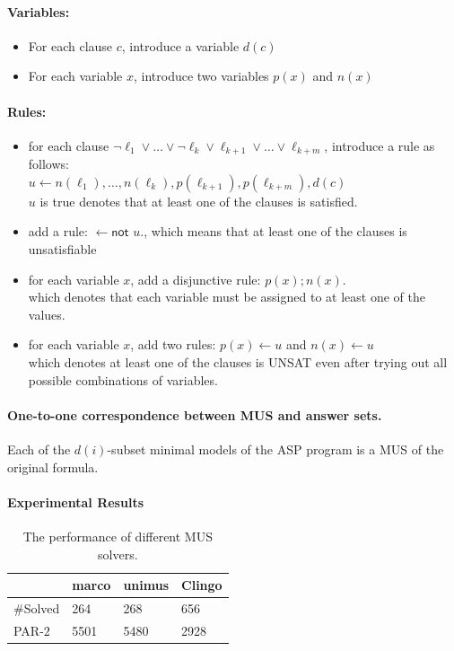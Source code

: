 \documentclass{article}
\begin{document}
\paragraph{Variables:}
\begin{itemize}
    \item For each clause $c$, introduce a variable $d(c)$
    \item For each variable $x$, introduce two variables $p(x)$ and $n(x)$
\end{itemize}
\paragraph{Rules:}
\begin{itemize}
    \item for each clause $\neg{\ell_1} \vee \ldots \vee 
    \neg{\ell_k} \vee \ell_{k+1} \vee \ldots \vee \ell_{k+m}$, 
    introduce a rule as follows:\\
    $u \leftarrow n(\ell_1), \ldots, n(\ell_k), p(\ell_{k+1}), p(\ell_{k+m}), d(c)$\\
    $u$ is true denotes that at least one of the clauses is satisfied.
    \item add a rule: $\leftarrow \textsf{not } u.$,
    which means that at least one of the clauses is unsatisfiable
    \item for each variable $x$, add a disjunctive rule: $p(x) ; n(x).$\\
    which denotes that each variable must be assigned to at least one of the values.
    \item for each variable $x$, add two rules: $p(x) \leftarrow u$ and $n(x) \leftarrow u$\\
    which denotes at least one of the clauses is UNSAT even after trying out all possible combinations of variables.
\end{itemize}
\paragraph{One-to-one correspondence between MUS and answer sets.}
Each of the $d(i)$-subset minimal models of the ASP program is a MUS of the original formula. 
\paragraph{Experimental Results}
\begin{table}[h]
  \centering
  \begin{tabular}{m{5em} m{5em} m{6em} m{10em}} 
  \toprule
   & marco & unimus & Clingo\\
  \midrule
  \#Solved & 264 & 268 & 656\\
  \midrule
  PAR-$2$ & 5501 & 5480 & 2928\\
  \bottomrule
  \end{tabular}
  \caption{The performance of different MUS solvers.}
  \label{table:mus_counting_result}
\end{table}
\end{document}
